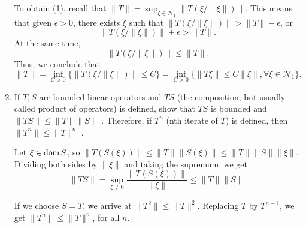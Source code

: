 \documentclass{article}
\theoremstyle{remark}
\newenvironment{exercise}[1]
  {\renewcommand\theinnerex{#1}\innerex}
  {\endinnerex}
\newcommand{\norm}[1]{\lVert #1 \rVert}
\begin{document}
\begin{exercise}{1.1.13}
\begin{enumerate}
              To obtain (1), recall that $\lVert T \rVert = \sup_{\xi \in \mathcal{N}_1} \lVert T \left( {\xi}/{\lVert \xi \rVert} \right) \rVert$. This means that given $\epsilon > 0$, there exists $\xi$
              such that $\lVert T \left( {\xi}/{\lVert \xi \rVert} \right) \rVert > \lVert T \rVert - \epsilon $, or $$\lVert T \left( {\xi}/{\lVert \xi \rVert} \right) \rVert + \epsilon > \lVert T \rVert.$$
              At the same time, $$\lVert T \left( {\xi}/{\lVert \xi \rVert} \right) \rVert \leq \lVert T \rVert.$$
              Thus, we conclude that
              $$\lVert T \rVert = \inf_{C>0} \{ \lVert T \left( {\xi}/{\lVert \xi \rVert} \right) \rVert \leq C\}
                  = \inf_{C>0} \{ \lVert T \xi \rVert \leq C {\lVert \xi \rVert} , \forall \xi \in \mathcal{N}_1 \}.$$

        \item If $T, S$ are bounded linear operators and $T S$ (the composition, but usually called
              product of operators) is defined, show that $T S$ is bounded and $\lVert T S \rVert \leq \lVert T \rVert \lVert S \rVert $ .
              Therefore, if $T^n$ (nth iterate of $T$) is defined, then $\lVert T ^n \rVert \leq \lVert T \rVert ^n$ .

              Let $\xi \in \operatorname{dom} S$, so $ \lVert T(S(\xi)) \rVert \leq  \lVert T \rVert  \lVert S(\xi) \rVert \leq \lVert T \rVert  \lVert S \rVert \lVert \xi \rVert $.
              Dividing both sides by $\lVert \xi \rVert $ and taking the supremum, we get
              $$ \lVert TS \rVert = \sup_{\xi \neq 0} \frac{\lVert T(S(\xi)) \rVert}{\lVert \xi \rVert } \leq \lVert T \rVert  \lVert S \rVert . $$

              If we choose $S = T$, we arrive at $\norm{T^2} \leq \norm{T}^2$. Replacing $T$ by $T^{n-1}$, we get $\norm{T^{n}} \leq  \norm{T} ^{n}$,
              for all $n$.

    \end{enumerate}

\end{exercise}
\end{document}
